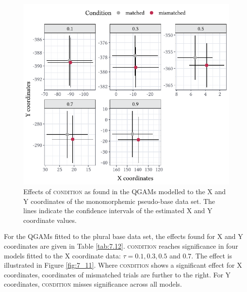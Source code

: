 \begin{figure}
    \centering
    \includegraphics[]{figures/fig7.10.pdf}
    \caption{Effects of \textsc{condition} as found in the QGAMs modelled to the X and Y coordinates of the monomorphemic pseudo-base data set. The lines indicate the confidence intervals of the estimated X and Y coordinate values.}
    \label{fig:7_10}
\end{figure}

For the QGAMs fitted to the plural base data set, the effects found for X and Y coordinates are given in Table \ref{tab:7.12}. \textsc{condition} reaches significance in four models fitted to the X coordinate data: $\tau=0.1,0.3,0.5$ and $0.7$. The effect is illustrated in Figure \ref{fig:7_11}. Where \textsc{condition} shows a significant effect for X coordinates, coordinates of mismatched trials are further to the right. For Y coordinates, \textsc{condition} misses significance across all models.

